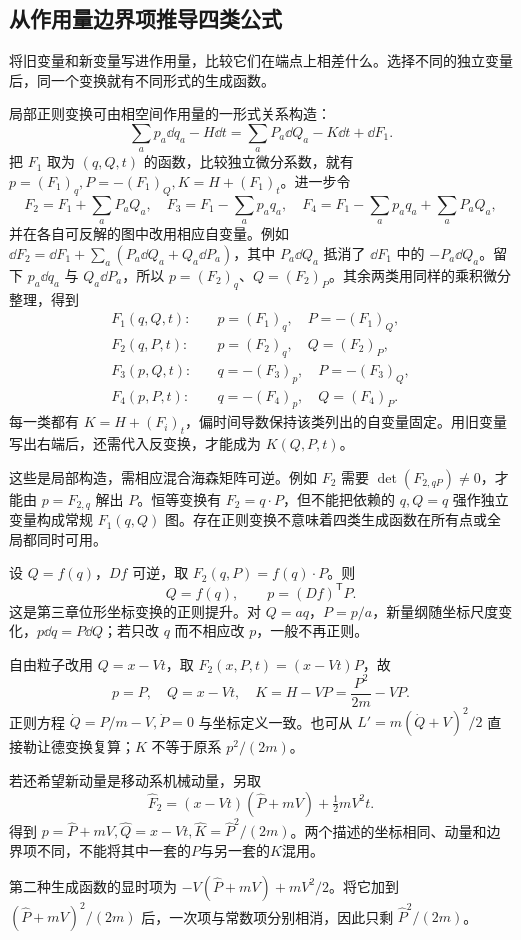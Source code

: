 \subsection{从作用量边界项推导四类公式}
将旧变量和新变量写进作用量，比较它们在端点上相差什么。选择不同的独立变量后，同一个变换就有不同形式的生成函数。

局部正则变换可由相空间作用量的一形式关系构造：
\[
\sum_ap_a\dd q_a-H\dd t
=\sum_aP_a\dd Q_a-K\dd t+\dd F_1.
\]
把 $F_1$ 取为 $(q,Q,t)$ 的函数，比较独立微分系数，就有 $p=(F_1)_q,P=-(F_1)_Q,K=H+(F_1)_t$。进一步令
\[
F_2=F_1+\sum_aP_aQ_a,\quad
F_3=F_1-\sum_ap_aq_a,\quad
F_4=F_1-\sum_ap_aq_a+\sum_aP_aQ_a,
\]
并在各自可反解的图中改用相应自变量。例如 $\dd F_2=\dd F_1+\sum_a(P_a\dd Q_a+Q_a\dd P_a)$，其中 $P_a\dd Q_a$ 抵消了 $\dd F_1$ 中的 $-P_a\dd Q_a$。留下 $p_a\dd q_a$ 与 $Q_a\dd P_a$，所以 $p=(F_2)_q$、$Q=(F_2)_P$。其余两类用同样的乘积微分整理，得到
\begin{align}
F_1(q,Q,t):&\quad p=(F_1)_q,\quad P=-(F_1)_Q,\label{eq:F1}\\
F_2(q,P,t):&\quad p=(F_2)_q,\quad Q=(F_2)_P,\label{eq:F2}\\
F_3(p,Q,t):&\quad q=-(F_3)_p,\quad P=-(F_3)_Q,\label{eq:F3}\\
F_4(p,P,t):&\quad q=-(F_4)_p,\quad Q=(F_4)_P.\label{eq:F4}
\end{align}
每一类都有 $K=H+(F_i)_t$，偏时间导数保持该类列出的自变量固定。用旧变量写出右端后，还需代入反变换，才能成为 $K(Q,P,t)$。

这些是局部构造，需相应混合海森矩阵可逆。例如 $F_2$ 需要 $\det(F_{2,qP})\ne0$，才能由 $p=F_{2,q}$ 解出 $P$。恒等变换有 $F_2=q\cdot P$，但不能把依赖的 $q,Q=q$ 强作独立变量构成常规 $F_1(q,Q)$ 图。存在正则变换不意味着四类生成函数在所有点或全局都同时可用。

\begin{example}[可逆点变换及其动量]
设 $Q=f(q)$，$Df$ 可逆，取 $F_2(q,P)=f(q)\cdot P$。则
\[
Q=f(q),\qquad p=(Df)^{\mathsf T}P.
\]
这是第三章位形坐标变换的正则提升。对 $Q=aq$，$P=p/a$，新量纲随坐标尺度变化，$p\dd q=P\dd Q$；若只改 $q$ 而不相应改 $p$，一般不再正则。
\end{example}

\begin{example}
自由粒子改用 $Q=x-Vt$，取 $F_2(x,P,t)=(x-Vt)P$，故
\[
p=P,\quad Q=x-Vt,\quad K=H-VP=\frac{P^2}{2m}-VP.
\]
正则方程 $\dot Q=P/m-V,\dot P=0$ 与坐标定义一致。也可从 $L'=m(\dot Q+V)^2/2$ 直接勒让德变换复算；$K$ 不等于原系 $p^2/(2m)$。

若还希望新动量是移动系机械动量，另取
\[
\widehat F_2=(x-Vt)(\widehat P+mV)+\tfrac12mV^2t.
\]
得到 $p=\widehat P+mV,\widehat Q=x-Vt,\widehat K=\widehat P^2/(2m)$。两个描述的坐标相同、动量和边界项不同，不能将其中一套的$P$与另一套的$K$混用。

第二种生成函数的显时项为 $-V(\widehat P+mV)+mV^2/2$。将它加到 $(\widehat P+mV)^2/(2m)$ 后，一次项与常数项分别相消，因此只剩 $\widehat P^2/(2m)$。
\end{example}

